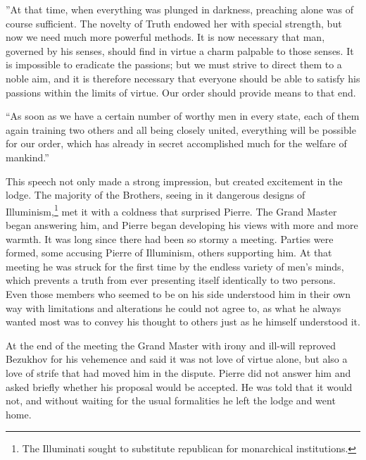 ''At that time, when everything was plunged in darkness,
preaching alone was of course sufficient. The novelty of Truth
endowed her with special strength, but now we need much more
powerful methods. It is now necessary that man, governed by his
senses, should find in virtue a charm palpable to those
senses. It is impossible to eradicate the passions; but we must
strive to direct them to a noble aim, and it is therefore
necessary that everyone should be able to satisfy his passions
within the limits of virtue. Our order should provide means to
that end.

``As soon as we have a certain number of worthy men in every
state, each of them again training two others and all being
closely united, everything will be possible for our order, which
has already in secret accomplished much for the welfare of
mankind.''

This speech not only made a strong impression, but created
excitement in the lodge. The majority of the Brothers, seeing in
it dangerous designs of Illuminism,\footnote{The Illuminati
sought to substitute republican for monarchical institutions.}
met it with a coldness that surprised Pierre. The Grand Master
began answering him, and Pierre began developing his views with
more and more warmth. It was long since there had been so stormy
a meeting. Parties were formed, some accusing Pierre of
Illuminism, others supporting him. At that meeting he was struck
for the first time by the endless variety of men's minds, which
prevents a truth from ever presenting itself identically to two
persons. Even those members who seemed to be on his side
understood him in their own way with limitations and alterations
he could not agree to, as what he always wanted most was to
convey his thought to others just as he himself understood it.

At the end of the meeting the Grand Master with irony and
ill-will reproved Bezukhov for his vehemence and said it was not
love of virtue alone, but also a love of strife that had moved
him in the dispute.  Pierre did not answer him and asked briefly
whether his proposal would be accepted. He was told that it would
not, and without waiting for the usual formalities he left the
lodge and went home.


